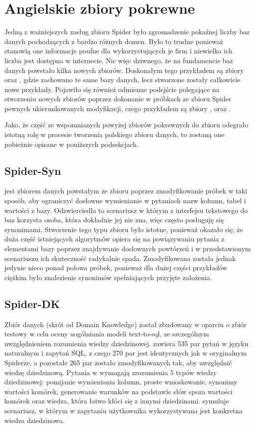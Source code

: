 \section{Angielskie zbiory pokrewne}
Jedną z ważniejszych zasług zbioru Spider było zgromadzenie pokaźnej liczby baz danych pochodzących z bardzo różnych domen. Było to trudne ponieważ stanowią one informacje poufne dla wykorzystujących je firm i niewielka ich liczba jest dostępna w internecie. Nic więc dziwnego, że na fundamencie baz danych  powstało kilka nowych zbiorów. Doskonałym tego przykładem są zbiory  oraz , gdzie zachowano te same bazy danych, lecz stworzone zostały całkowicie nowe przykłady. Pojawiło się również odmienne podejście polegające na stworzeniu nowych zbiorów poprzez dokonanie w próbkach ze zbioru Spider pewnych ukierunkowanych modyfikacji, czego przykładem są zbiory ,  oraz .

Jako, że część ze wspomnianych powyżej zbiorów pokrewnych do zbioru  odegrało istotną rolę w procesie tworzenia polskiego zbioru danych, to zostaną one pobieżnie opisane w poniższych podsekcjach.

\subsection{Spider-Syn}
 jest zbiorem danych powstałym ze zbioru  poprzez zmodyfikowanie próbek w taki sposób, aby ograniczyć dosłowne wymienianie w pytaniach nazw kolumn, tabel i wartości z bazy. Odzwierciedla to scenariusz w którym z interfejsu tekstowego do baz korzysta osoba, która dokładnie jej nie zna, więc często posługuję się synonimami. Stworzenie tego typu zbioru było istotne, ponieważ okazało się, że duża część istniejących algorytmów opiera się na powiązywaniu pytania z elementami bazy poprzez znajdywanie dosłownych powtórzeń i w przedstawionym scenariuszu ich skuteczność radykalnie spada. Zmodyfikowana została jednak jedynie nieco ponad połowa próbek, ponieważ dla dużej części przykładów ciężkim było znalezienie synonimów spełniających przyjęte założenia.

\subsection{Spider-DK}
Zbiór danych  (skrót od Domain Knowledge) został zbudowany w oparciu o zbiór testowy  w celu oceny uogólniania modeli text-to-sql, ze szczególnym uwzględnieniem rozumienia wiedzy dziedzinowej.  zawiera 535 par pytań w języku naturalnym i zapytań SQL, z czego 270 par jest identycznych jak w oryginalnym Spiderze, a pozostałe 265 par zostało zmodyfikowanych tak, aby uwzględnić wiedzę dziedzinową. Pytania w  wymagają zrozumienia 5 typów wiedzy dziedzinowej: pomijanie wymieniania kolumn, proste wnioskowanie, synonimy wartości komórek, generowanie warunków na podstawie słów spoza wartości komórek oraz wiedza, która łatwo kłóci się z innymi dziedzinami.  symuluje scenariusz, w którym w zapytaniu użytkownika wykorzystywana jest konkretna wiedza dziedzinowa.

